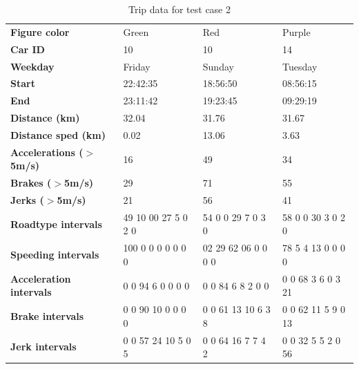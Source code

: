 \begin{table}
    \centering
    \begin{tabular}{>{\bfseries}l|lll|}
    Figure color            & Green                & Red                 & Purple             \\
    Car ID                  & 10                   & 10                  & 14                 \\
    Weekday                 & Friday               & Sunday              & Tuesday            \\
    Start                   & 22:42:35             & 18:56:50            & 08:56:15           \\
    End                     & 23:11:42             & 19:23:45            & 09:29:19           \\
    Distance (km)           & 32.04                & 31.76               & 31.67              \\
    Distance sped (km)      & 0.02                 & 13.06               & 3.63               \\
    Accelerations ($>$5m/s) & 16                   & 49                  & 34                 \\
    Brakes ($>$5m/s)        & 29                   & 71                  & 55                 \\
    Jerks ($>$5m/s)         & 21                   & 56                  & 41                 \\
    Roadtype intervals      & 49 10 00 27 5  0 2 0 & 54 0 0 29 7 0 3 0   & 58 0 0 30 3 0 2 0  \\
    Speeding intervals      & 100 0 0 0 0 0 0 0    & 02 29 62 06 0 0 0 0 & 78 5 4 13 0 0 0 0  \\
    Acceleration intervals  & 0 0 94 6 0 0 0 0     & 0 0 84 6 8 2 0 0    & 0 0 68 3 6 0 3 21  \\
    Brake intervals         & 0 0 90 10 0 0 0 0    & 0 0 61 13 10 6 3 8  & 0 0 62 11 5 9 0 13 \\
    Jerk intervals          & 0 0 57 24 10 5 0 5   & 0 0 64 16 7 7 4 2   & 0 0 32 5 5 2 0 56  \\
    \end{tabular}
    \caption{Trip data for test case 2}
    \label{tab:longtrips}
\end{table}